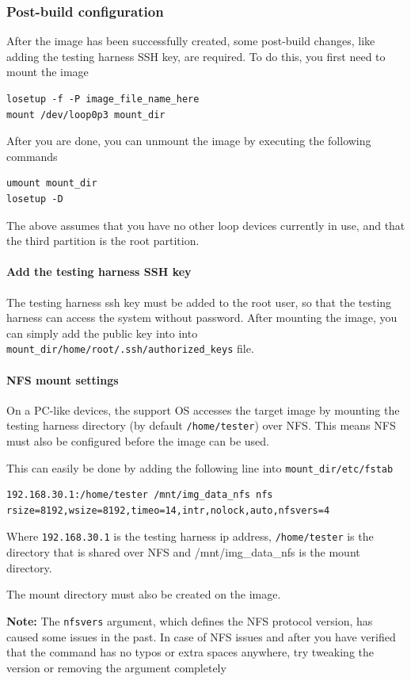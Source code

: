 \documentclass[a4paper,11pt]{article}
\newcommand{\note}{\textbf{Note: }}
\newcommand{\cmd}[1]{\texttt{#1}}
\begin{document}
\subsubsection*{Post-build configuration}

After the image has been successfully created, some post-build changes, like adding the testing harness SSH key, are required. To do this, you first need to mount the image

\begin{lstlisting}
losetup -f -P image_file_name_here
mount /dev/loop0p3 mount_dir
\end{lstlisting}

After you are done, you can unmount the image by executing the following commands

\begin{lstlisting}
umount mount_dir
losetup -D
\end{lstlisting}

The above assumes that you have no other loop devices currently in use, and that the third partition is the root partition.

\paragraph*{Add the testing harness SSH key}

The testing harness ssh key must be added to the root user, so that the testing harness can access the system without password. After mounting the image, you can simply add the public key into into \cmd{mount\_dir/home/root/.ssh/authorized\_keys} file.

\paragraph*{NFS mount settings}

On a PC-like devices, the support OS accesses the target image by mounting the testing harness directory (by default \cmd{/home/tester}) over NFS. This means NFS must also be configured before the image can be used.

This can easily be done by adding the following line into \cmd{mount\_dir/etc/fstab}

\begin{lstlisting}
192.168.30.1:/home/tester /mnt/img_data_nfs nfs rsize=8192,wsize=8192,timeo=14,intr,nolock,auto,nfsvers=4
\end{lstlisting}

Where \cmd{192.168.30.1} is the testing harness ip address, \cmd{/home/tester} is the directory that is shared over NFS and {/mnt/img\_data\_nfs} is the mount directory.

The mount directory must also be created on the image.

\note The \cmd{nfsvers} argument, which defines the NFS protocol version, has caused some issues in the past. In case of NFS issues and after you have verified that the command has no typos or extra spaces anywhere, try tweaking the version or removing the argument completely
\end{document}
